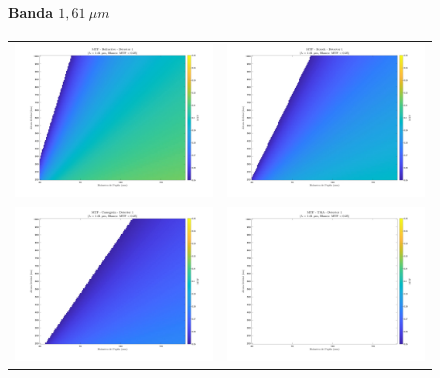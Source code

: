 \begin{landscape}
\begin{figure}[p]
\centering
\setlength{\tabcolsep}{2pt}
\renewcommand{\arraystretch}{0}
\paragraph{Banda $1,61\ \mu m$}
\begin{tabular}{cc}
\includegraphics[width=0.48\linewidth]{4.Payload/MTF/MTF_Lambda1_Detector1_Telescopio1_heatmap.jpg} &
\includegraphics[width=0.48\linewidth]{4.Payload/MTF/MTF_Lambda1_Detector1_Telescopio2_heatmap.jpg} \\
\includegraphics[width=0.48\linewidth]{4.Payload/MTF/MTF_Lambda1_Detector1_Telescopio3_heatmap.jpg} &
\includegraphics[width=0.48\linewidth]{4.Payload/MTF/MTF_Lambda1_Detector1_Telescopio4_heatmap.jpg} \\
\end{tabular}


\end{figure}
\end{landscape}
